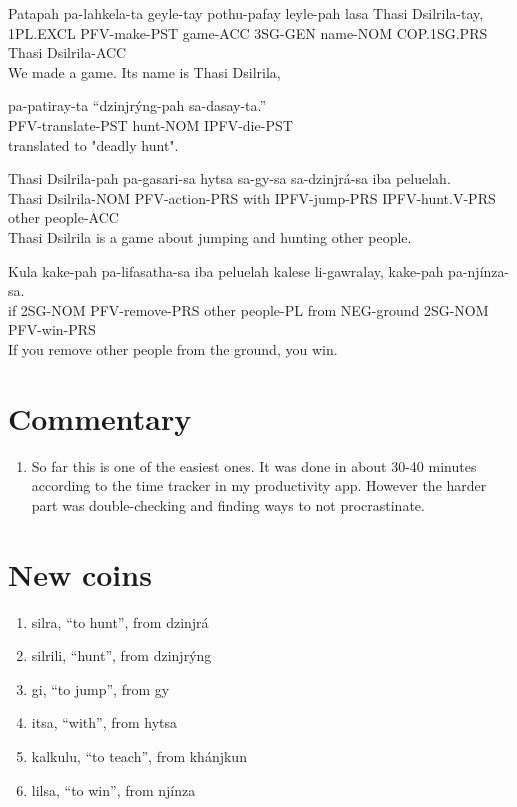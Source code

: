 \documentclass{thiguka}
\begin{document}
\begin{exe}
\ex{} \gll{}Patapah  pa-lahkela-ta geyle-tay pothu-pafay leyle-pah lasa        Thasi Dsilrila-tay,\\
            1PL.EXCL PFV-make-PST  game-ACC  3SG-GEN     name-NOM  COP.1SG.PRS Thasi Dsilrila-ACC\\
      \glt{}We made a game. Its name is Thasi Dsilrila,
\end{exe}

\begin{exe}
\ex{} \gll{}pa-patiray-ta     ``dzinjrýng-pah sa-dasay-ta.''\\
            PFV-translate-PST  hunt-NOM      IPFV-die-PST\\
      \glt{}translated to "deadly hunt".
\end{exe}

\begin{exe}
\ex{} \gll{}Thasi Dsilrila-pah pa-gasari-sa   hytsa sa-gy-sa      sa-dzinjrá-sa   iba   peluelah.\\
            Thasi Dsilrila-NOM PFV-action-PRS with  IPFV-jump-PRS IPFV-hunt.V-PRS other people-ACC\\
      \glt{}Thasi Dsilrila is a game about jumping and hunting other people.
\end{exe}

\begin{exe}
\ex{} \gll{}Kula kake-pah pa-lifasatha-sa iba   peluelah  kalese li-gawralay, kake-pah pa-njínza-sa.\\
            if   2SG-NOM  PFV-remove-PRS  other people-PL from   NEG-ground   2SG-NOM  PFV-win-PRS\\
      \glt{}If you remove other people from the ground, you win.
\end{exe}

\section{Commentary}
\begin{enumerate}
    \item So far this is one of the easiest ones. It was done in about 30-40 minutes according to the time tracker in my productivity app. However the harder part was double-checking and finding ways to not procrastinate.
\end{enumerate}

\newpage

\section{New coins}
\begin{enumerate}
    \item silra, ``to hunt'', from dzinjrá
    \item silrili, ``hunt'', from dzinjrýng
    \item gi, ``to jump'', from gy
    \item itsa, ``with'', from hytsa
    \item kalkulu, ``to teach'', from khánjkun
    \item lilsa, ``to win'', from njínza
\end{enumerate}
\end{document}
